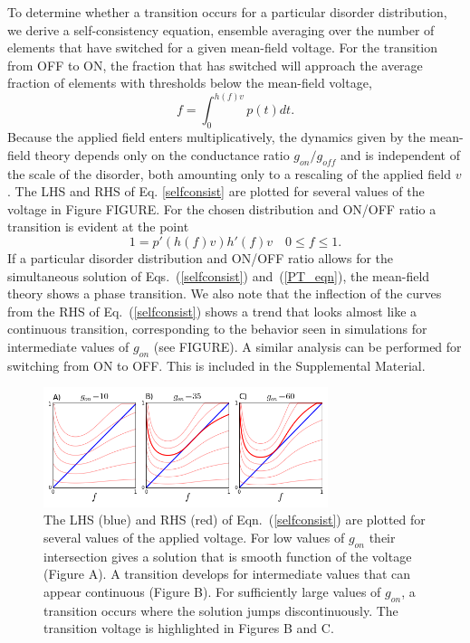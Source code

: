 \documentclass[aps,prl,reprint,groupedaddress]{revtex4-1}
\begin{document}
To determine whether a transition occurs for a particular disorder
distribution, we derive a
self-consistency equation, ensemble averaging over the number of elements
that have switched for a given mean-field voltage. For the transition from
OFF to ON, the fraction that has switched will approach the average fraction
of elements with thresholds below the mean-field voltage,
\begin{equation}\label{selfconsist}
f = \int_0^{h(f) v} p(t) dt.
\end{equation}
Because the applied field enters multiplicatively, the dynamics given by
the mean-field theory depends only on the conductance ratio $g_{on}/g_{off}$
and is independent of the scale of the disorder, both amounting only to
a rescaling of the applied field $v$.  The LHS and
RHS of Eq. \ref{selfconsist} are plotted for several values of the voltage
in Figure FIGURE.  For
the chosen distribution and ON/OFF ratio a transition is evident at the
point
\begin{equation}\label{PT_eqn}
1 = p'(h(f)v)h'(f)v \quad 0\le f\le 1.
\end{equation}
If a particular disorder distribution and ON/OFF ratio allows for the
simultaneous solution of Eqs.~(\ref{selfconsist}) and~(\ref{PT_eqn}), the mean-field
theory shows a phase transition. We also note that the inflection
of the curves from the RHS of Eq.~(\ref{selfconsist}) shows a trend that looks almost like a continuous
transition, corresponding to the behavior seen in simulations for intermediate
values of $g_{on}$ (see FIGURE).
A similar analysis can be performed
for switching from ON to OFF. This is included in the Supplemental Material.

\begin{figure}
\includegraphics[width=8.3cm]{MF_self_consist.png}
\caption{The LHS (blue) and RHS (red) of Eqn.~(\ref{selfconsist}) are plotted
for several values of the applied voltage.  For low values of $g_{on}$ their
intersection gives a solution that is smooth function of the voltage (Figure A).
A transition develops for intermediate values that can appear continuous
(Figure B). For sufficiently large values of $g_{on}$, a transition occurs where the
solution jumps discontinuously.  The transition voltage is highlighted in
Figures B and C.
\label{MF_SC_fig}}
\end{figure}
\end{document}
